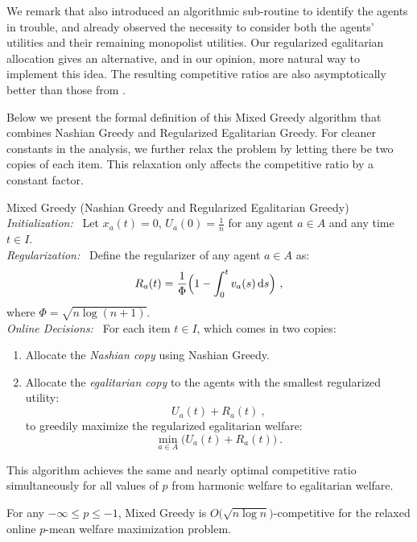 \documentclass[11pt,letterpaper]{article}
\newcommand{\dif}[1]{\,\text{\rm d} #1}
\newcommand{\utility}{U}
\newcommand{\regularizer}{R}
\begin{document}
We remark that \citet{BarmanKM:AAAI:2022} also introduced an algorithmic sub-routine to identify the agents in trouble, and already observed the necessity to consider both the agents' utilities and their remaining monopolist utilities. 
Our regularized egalitarian allocation gives an alternative, and in our opinion, more natural way to implement this idea.
The resulting competitive ratios are also asymptotically better than those from \citet{BarmanKM:AAAI:2022}.

Below we present the formal definition of this Mixed Greedy algorithm that combines Nashian Greedy and Regularized Egalitarian Greedy.
For cleaner constants in the analysis, we further relax the problem by letting there be two copies of each item.
This relaxation only affects the competitive ratio by a constant factor.



\begin{algorithm}{Mixed Greedy (Nashian Greedy and Regularized Egalitarian Greedy)}
	\emph{Initialization:~}
	Let $x_a(t) = 0$, $\utility_a(0) = \frac{1}{n}$ for any agent $a \in A$ and any time $t \in I$.\\[2ex]
	\emph{Regularization:~}
	Define the regularizer of any agent $a \in A$ as:
	\[
	\regularizer_a(t) = \frac{1}{\Phi} 
	\Big(1 - \int_0^t v_a(s) \dif{s} \Big)
	~,
	\]
	where $\Phi = \sqrt{n \log(n+1)}$.\\[2ex]
	\emph{Online Decisions:~}
	For each item $t \in I$, which comes in two copies:
	\begin{enumerate}
	\item Allocate the \emph{Nashian copy} using Nashian Greedy.
	\item Allocate the \emph{egalitarian copy} to the agents with the smallest regularized utility:
		\[
			\utility_a(t) + \regularizer_a(t)
			~,
		\]
		to greedily maximize the regularized egalitarian welfare:
		\[
			\min_{a \in A} \big( \utility_a(t) + \regularizer_a(t) \big)
			~.
		\]
	\end{enumerate}
\end{algorithm}

This algorithm achieves the same and nearly optimal competitive ratio simultaneously for all values of $p$ from harmonic welfare to egalitarian welfare.


\begin{theorem}
	\label{thm:harmonic-to-egalitarian}
	For any $-\infty \le p \le -1$, Mixed Greedy is $O \big( \sqrt{n \log n} \big)$-competitive for the relaxed online $p$-mean welfare maximization problem.
\end{theorem}
\end{document}
